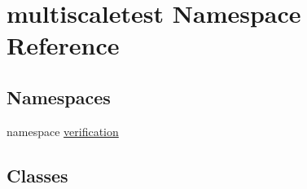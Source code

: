 \hypertarget{namespacemultiscaletest}{\section{multiscaletest Namespace Reference}
\label{namespacemultiscaletest}
}
\subsection*{Namespaces}
\begin{DoxyCompactItemize}
\item 
namespace \hyperlink{namespacemultiscaletest_1_1verification}{verification}
\end{DoxyCompactItemize}
\subsection*{Classes}
